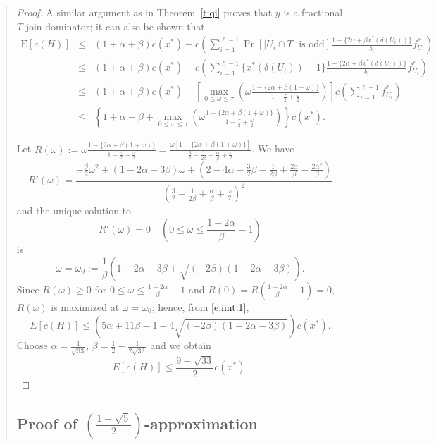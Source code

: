 \documentclass[11pt,letterpaper]{article}
\newcommand{\E}{\mathrm{E}}
\begin{document}
\begin{quote}
\begin{proof}
A similar argument as in Theorem~\ref{t:qi} proves that $y$ is a fractional $T$-join dominator; it can also be shown that\begin{eqnarray}
\E[c(H)] &\leq& (1+\alpha+\beta)c(x^*)+ c\left(\sum_{i=1}^{\ell-1} \Pr[|U_i \cap T|\textrm{ is odd}] \frac{1-\{2\alpha+\beta x^*(\delta(U_i))\}}{b_i}f^*_{U_i}\right) \nonumber\\
&\leq& (1+\alpha+\beta)c(x^*)+ c\left(\sum_{i=1}^{\ell-1} \{x^*(\delta(U_i))-1\} \frac{1-\{2\alpha+\beta x^*(\delta(U_i))\}}{b_i}f^*_{U_i}\right)\nonumber\\
&\leq& (1+\alpha+\beta)c(x^*)+ \left[\max_{0\leq\omega\leq \tau}\left(\omega\frac{1-\{2\alpha+\beta(1+\omega)\}}{1-\frac{\tau}{2}+\frac{\omega}{2}}\right)\right] c\left(\sum_{i=1}^{\ell-1} f^*_{U_i}\right)\nonumber\\
&\leq& \left\{ 1+\alpha+\beta+ \max_{0\leq\omega\leq \tau}\left(\omega\frac{1-\{2\alpha+\beta(1+\omega)\}}{1-\frac{\tau}{2}+\frac{\omega}{2}}\right)\right\}c(x^*)\label{e:iint:1}
.\end{eqnarray}

Let $\displaystyle R(\omega):=\omega\frac{1-\{2\alpha+\beta(1+\omega)\}}{1-\frac{\tau}{2}+\frac{\omega}{2}} = \frac{\omega[1-\{2\alpha+\beta(1+\omega)\}]}{\frac{3}{2}-\frac{1}{2\beta}+\frac{\alpha}{\beta}+\frac{\omega}{2}}$. We have\[
R'(\omega )=\frac{-\frac{\beta}{2}\omega^2+(1-2\alpha-3\beta)\omega+\left(2-4\alpha-\frac{3}{2}\beta-\frac{1}{2\beta}+\frac{2\alpha}{\beta}-\frac{2\alpha^2}{\beta}\right)}{\left(\frac{3}{2}-\frac{1}{2\beta}+\frac{\alpha}{\beta}+\frac{\omega}{2}\right)^2}
\]and the unique solution to\[
R'(\omega)=0\quad(0\leq\omega\leq\frac{1-2\alpha}{\beta}-1)
\]is\[
\omega=\omega_0 :=\frac{1}{\beta}\left(1-2\alpha-3\beta+\sqrt{(-2\beta)(1-2\alpha-3\beta)}\right)
.\]Since $R(\omega)\geq 0$ for $0\leq\omega\leq\frac{1-2\alpha}{\beta}-1$ and $R(0)=R(\frac{1-2\alpha}{\beta}-1)=0$, $R(\omega)$ is maximized at $\omega=\omega_0$; hence, from \eqref{e:iint:1},\[
E[c(H)]\leq\left(5\alpha+11\beta-1-4\sqrt{(-2\beta)(1-2\alpha-3\beta)}\right)c(x^*)
.\]
Choose $\alpha=\frac{1}{\sqrt{33}}$, $\beta=\frac{1}{2}-\frac{1}{2\sqrt{33}}$ and we obtain\[
E[c(H)]\leq \frac{9-\sqrt{33}}{2}c(x^*)
.\]
\end{proof}

\subsection{Proof of $\left(\frac{1+\sqrt{5}}{2}\right)$-approximation}


\end{quote}
\end{document}
